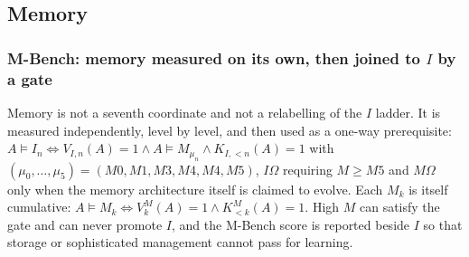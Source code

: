 \documentclass[11pt]{article}
\theoremstyle{definition}
\begin{document}
\subsection{Memory}
\subsubsection{M-Bench: memory measured on its own, then joined to $I$ by a gate}\label{sec:mbench}

Memory is not a seventh coordinate and not a relabelling of the $I$ ladder. It is measured independently, level by level, and then used as a one-way prerequisite: $A \models I_n \iff V_{I,n}(A) = 1 \wedge A \models M_{\mu_n} \wedge K_{I,<n}(A) = 1$ with $(\mu_0,\ldots,\mu_5) = (M0, M1, M3, M4, M4, M5)$, $I\Omega$ requiring $M \ge M5$ and $M\Omega$ only when the memory architecture itself is claimed to evolve. Each $M_k$ is itself cumulative: $A \models M_k \iff V^{M}_k(A) = 1 \wedge K^{M}_{<k}(A) = 1$. High $M$ can satisfy the gate and can never promote $I$, and the M-Bench score is reported beside $I$ so that storage or sophisticated management cannot pass for learning.
\end{document}
